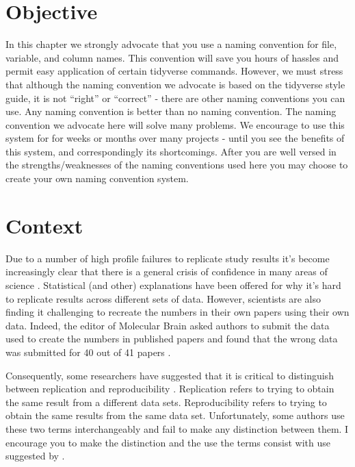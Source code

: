 \documentclass[
]{krantz}
\begin{document}
\hypertarget{objective}{%
\section{Objective}\label{objective}}

In this chapter we strongly advocate that you use a naming convention for file, variable, and column names. This convention will save you hours of hassles and permit easy application of certain tidyverse commands. However, we must stress that although the naming convention we advocate is based on the tidyverse style guide, it is not ``right'' or ``correct'' - there are other naming conventions you can use. Any naming convention is better than no naming convention. The naming convention we advocate here will solve many problems. We encourage to use this system for for weeks or months over many projects - until you see the benefits of this system, and correspondingly its shortcomings. After you are well versed in the strengths/weaknesses of the naming conventions used here you may choose to create your own naming convention system.

\hypertarget{context}{%
\section{Context}\label{context}}

Due to a number of high profile failures to replicate study results \citep{cos2015} it's become increasingly clear that there is a general crisis of confidence in many areas of science \citep{baker2016}. Statistical (and other) explanations have been offered \citep{simmons2011} for why it's hard to replicate results across different sets of data. However, scientists are also finding it challenging to recreate the numbers in their own papers using their own data. Indeed, the editor of Molecular Brain asked authors to submit the data used to create the numbers in published papers and found that the wrong data was submitted for 40 out of 41 papers \citep{miyakawa2020}.

Consequently, some researchers have suggested that it is critical to distinguish between replication and reproducibility \citep{patil2019}. Replication refers to trying to obtain the same result from a different data sets. Reproducibility refers to trying to obtain the same results from the same data set. Unfortunately, some authors use these two terms interchangeably and fail to make any distinction between them. I encourage you to make the distinction and the use the terms consist with use suggested by \citep{patil2019}.
\end{document}
